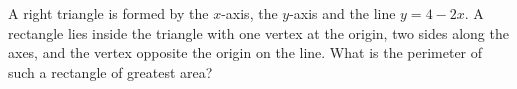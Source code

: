 A right triangle is formed by the $x$-axis, the $y$-axis and the line $y=4-2x$. A rectangle lies inside the triangle with one vertex at the origin, two sides along the axes, and the vertex opposite the origin on the line. What is the perimeter of such a rectangle of greatest area?

